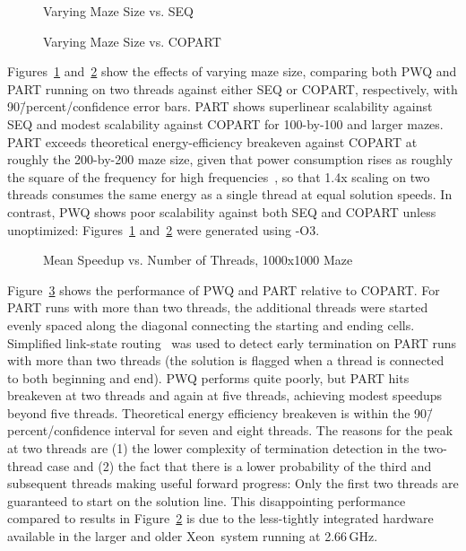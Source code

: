 \begin{figure}[tb]
\centering
{}
\caption{Varying Maze Size vs. SEQ}
\label{fig:SMPdesign:Varying Maze Size vs. SEQ}
\end{figure}

\begin{figure}[tb]
\centering
{}
\caption{Varying Maze Size vs. COPART}
\label{fig:SMPdesign:Varying Maze Size vs. COPART}
\end{figure}

Figures~\ref{fig:SMPdesign:Varying Maze Size vs. SEQ}
and~\ref{fig:SMPdesign:Varying Maze Size vs. COPART}
show the effects of varying maze size, comparing both PWQ and PART
running on two threads
against either SEQ or COPART, respectively, with 90\=/percent\-/confidence
error bars.
PART shows superlinear scalability against SEQ and modest scalability
against COPART for 100-by-100 and larger mazes.
PART exceeds theoretical energy-efficiency breakeven against COPART at roughly
the 200-by-200 maze size, given that power consumption rises as roughly
the square of the frequency for high frequencies~\cite{TrevorMudge2000Power},
so that 1.4x scaling on two threads consumes the same energy
as a single thread at equal solution speeds.
In contrast, PWQ shows poor scalability against both SEQ and COPART
unless unoptimized: Figures~\ref{fig:SMPdesign:Varying Maze Size vs. SEQ} 
and~\ref{fig:SMPdesign:Varying Maze Size vs. COPART}
were generated using -O3.

\begin{figure}[tb]
\centering
{}
\caption{Mean Speedup vs. Number of Threads, 1000x1000 Maze}
\label{fig:SMPdesign:Mean Speedup vs. Number of Threads, 1000x1000 Maze}
\end{figure}

Figure~\ref{fig:SMPdesign:Mean Speedup vs. Number of Threads, 1000x1000 Maze}
shows the performance of PWQ and PART relative to COPART.
For PART runs with more than two threads, the additional threads were
started evenly spaced along the diagonal connecting the starting and
ending cells.
Simplified link-state routing~\cite{BERT-87} was used to
detect early termination on PART runs with more than two threads
(the solution is flagged when
a thread is connected to both beginning and end).
PWQ performs quite poorly, but
PART hits breakeven at two threads and again at five threads, achieving
modest speedups beyond five threads.
Theoretical energy efficiency breakeven is within the 90\=/percent\-/confidence
interval for seven and eight threads.
The reasons for the peak at two threads are (1) the lower complexity
of termination detection in the two-thread case and (2) the fact that
there is a lower probability of the third and subsequent threads making
useful forward progress: Only the first two threads are guaranteed to start on
the solution line.
This disappointing performance compared to results in
Figure~\ref{fig:SMPdesign:Varying Maze Size vs. COPART}
is due to the less-tightly integrated hardware available in the
larger and older Xeon\mytextregistered\
system running at 2.66\,GHz.

